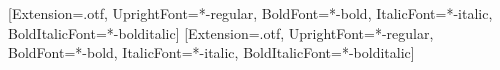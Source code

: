 \usepackage{iftex}
\ifXeTeX
  \usepackage{fontspec}
  \setmainfont{texgyretermes}[Extension=.otf, UprightFont=*-regular,
    BoldFont=*-bold, ItalicFont=*-italic, BoldItalicFont=*-bolditalic]
  \setmonofont{texgyrecursor}[Extension=.otf, UprightFont=*-regular,
    BoldFont=*-bold, ItalicFont=*-italic, BoldItalicFont=*-bolditalic]
\fi
